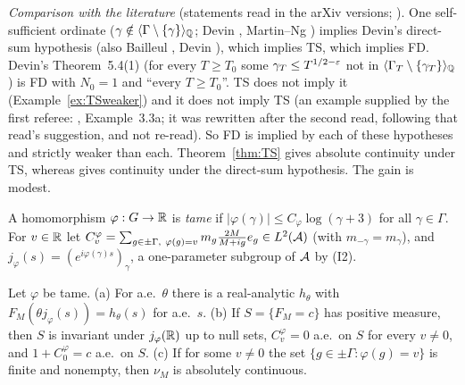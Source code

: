 \emph{Comparison with the literature} (statements read in the arXiv versions; ). One self-sufficient ordinate ($\gamma\notin\langle\Gamma\setminus\{\gamma\}\rangle_{\mathbb Q}$; Devin \cite[Theorem~5.4(2)]{Devin}, Martin--Ng \cite[Definition~1.3]{MN}) implies Devin's direct-sum hypothesis \cite[Theorem~2.2]{Devin} (also Bailleul \cite[Theorem~1.7]{Bailleul}, Devin \cite[Corollary~2]{Devin2}), which implies TS, which implies FD. Devin's Theorem~5.4(1) (for every $T\ge T_0$ some $\gamma_T\le T^{1/2-\varepsilon}$ not in $\langle\Gamma_T\setminus\{\gamma_T\}\rangle_{\mathbb Q}$) is FD with $N_0=1$ and ``every $T\ge T_0$''. TS does not imply it (Example~\ref{ex:TSweaker}) and it does not imply TS (an example supplied by the first referee: , Example~3.3a; it was rewritten after the second read, following that read's suggestion, and not re-read). So FD is implied by each of these hypotheses and strictly weaker than each. Theorem~\ref{thm:TS} gives absolute continuity under TS, whereas \cite[Theorem~2.2]{Devin} gives continuity under the direct-sum hypothesis. The gain is modest.

\begin{definition}
A homomorphism $\varphi:G\to\mathbb R$ is \emph{tame} if $|\varphi(\gamma)|\le C_\varphi\log(\gamma+3)$ for all $\gamma\in\Gamma$. For $v\in\mathbb R$ let $C^\varphi_v=\sum_{g\in\pm\Gamma,\ \varphi(g)=v}m_g\frac{2M}{M+ig}e_g\in L^2(\cA)$ (with $m_{-\gamma}=m_\gamma$), and $j_\varphi(s)=(e^{i\varphi(\gamma)s})_\gamma$, a one-parameter subgroup of $\mathcal A$ by (I2).
\end{definition}

\begin{theorem}\label{thm:tame}
Let $\varphi$ be tame. \textup{(a)} For a.e.\ $\theta$ there is a real-analytic $h_\theta$ with $F_M(\theta j_\varphi(s))=h_\theta(s)$ for a.e.\ $s$. \textup{(b)} If $S=\{F_M=c\}$ has positive measure, then $S$ is invariant under $j_\varphi(\mathbb R)$ up to null sets, $C^\varphi_v=0$ a.e.\ on $S$ for every $v\ne0$, and $1+C^\varphi_0=c$ a.e.\ on $S$. \textup{(c)} If for some $v\ne0$ the set $\{g\in\pm\Gamma:\varphi(g)=v\}$ is finite and nonempty, then $\nu_M$ is absolutely continuous.
\end{theorem}

